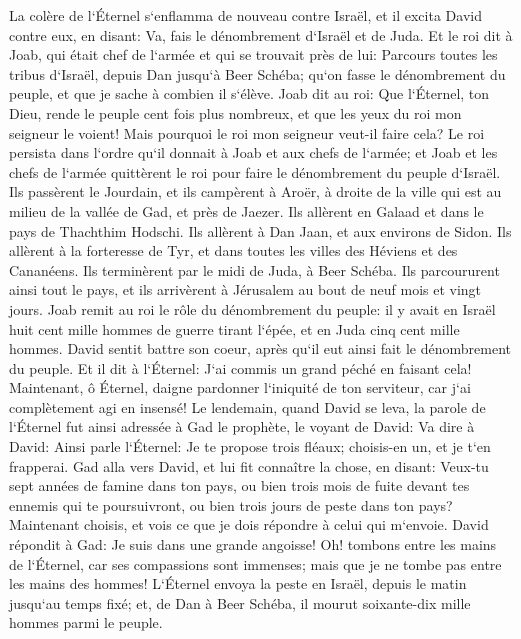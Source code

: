 \verse La colère de l`Éternel s`enflamma de nouveau contre Israël, et il excita David contre eux, en disant: Va, fais le dénombrement d`Israël et de Juda. 
\verse Et le roi dit à Joab, qui était chef de l`armée et qui se trouvait près de lui: Parcours toutes les tribus d`Israël, depuis Dan jusqu`à Beer Schéba; qu`on fasse le dénombrement du peuple, et que je sache à combien il s`élève. 
\verse Joab dit au roi: Que l`Éternel, ton Dieu, rende le peuple cent fois plus nombreux, et que les yeux du roi mon seigneur le voient! Mais pourquoi le roi mon seigneur veut-il faire cela? 
\verse Le roi persista dans l`ordre qu`il donnait à Joab et aux chefs de l`armée; et Joab et les chefs de l`armée quittèrent le roi pour faire le dénombrement du peuple d`Israël. 
\verse Ils passèrent le Jourdain, et ils campèrent à Aroër, à droite de la ville qui est au milieu de la vallée de Gad, et près de Jaezer. 
\verse Ils allèrent en Galaad et dans le pays de Thachthim Hodschi. Ils allèrent à Dan Jaan, et aux environs de Sidon. 
\verse Ils allèrent à la forteresse de Tyr, et dans toutes les villes des Héviens et des Cananéens. Ils terminèrent par le midi de Juda, à Beer Schéba. 
\verse Ils parcoururent ainsi tout le pays, et ils arrivèrent à Jérusalem au bout de neuf mois et vingt jours. 
\verse Joab remit au roi le rôle du dénombrement du peuple: il y avait en Israël huit cent mille hommes de guerre tirant l`épée, et en Juda cinq cent mille hommes. 
\verse David sentit battre son coeur, après qu`il eut ainsi fait le dénombrement du peuple. Et il dit à l`Éternel: J`ai commis un grand péché en faisant cela! Maintenant, ô Éternel, daigne pardonner l`iniquité de ton serviteur, car j`ai complètement agi en insensé! 
\verse Le lendemain, quand David se leva, la parole de l`Éternel fut ainsi adressée à Gad le prophète, le voyant de David: 
\verse Va dire à David: Ainsi parle l`Éternel: Je te propose trois fléaux; choisis-en un, et je t`en frapperai. 
\verse Gad alla vers David, et lui fit connaître la chose, en disant: Veux-tu sept années de famine dans ton pays, ou bien trois mois de fuite devant tes ennemis qui te poursuivront, ou bien trois jours de peste dans ton pays? Maintenant choisis, et vois ce que je dois répondre à celui qui m`envoie. 
\verse David répondit à Gad: Je suis dans une grande angoisse! Oh! tombons entre les mains de l`Éternel, car ses compassions sont immenses; mais que je ne tombe pas entre les mains des hommes! 
\verse L`Éternel envoya la peste en Israël, depuis le matin jusqu`au temps fixé; et, de Dan à Beer Schéba, il mourut soixante-dix mille hommes parmi le peuple. 
